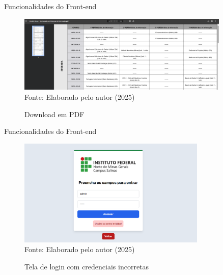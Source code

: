 \begin{frame}{Funcionalidades do Front-end}
    \begin{figure}
        \centering
        \vspace{-0.5cm}
        \caption{Download em PDF}
        \vspace{-0.2cm}
        \includegraphics[width=0.9\textwidth]{figuras/front-20.png}
        \\ %
        \small Fonte: Elaborado pelo autor (2025)
    \end{figure}
\end{frame}

\begin{frame}{Funcionalidades do Front-end}
    \begin{figure}
        \centering
        \vspace{-0.5cm}
        \caption{Tela de login com credenciais incorretas}
        \vspace{-0.2cm}
        \includegraphics[width=0.8\textwidth]{figuras/front-21.png}
        \\ %
        \small Fonte: Elaborado pelo autor (2025)
    \end{figure}
\end{frame}

